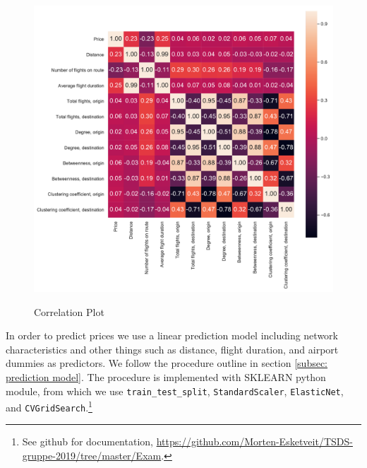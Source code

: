 \begin{figure}[H]
  \centering
  \caption{Correlation Plot}
    \includegraphics[width=0.9 \textwidth]{Exam/Figures/corr_plot.pdf}
  \label{fig:correl}
\end{figure}
In order to predict prices we use a linear prediction model including network characteristics and other things such as distance, flight duration, and airport dummies as predictors. We follow the procedure outline in section \ref{subsec: prediction model}. The procedure is implemented with SKLEARN python module, from which we use \texttt{train\_test\_split}, \texttt{StandardScaler}, \texttt{ElasticNet}, and  \texttt{CVGridSearch}.\footnote{See github for documentation, \url{https://github.com/Morten-Esketveit/TSDS-gruppe-2019/tree/master/Exam}.}


